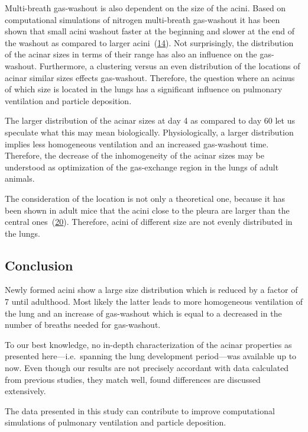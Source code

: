 \documentclass[
  american,
]{article}
\begin{document}
Multi-breath gas-washout is also dependent on the size of the acini.
Based on computational simulations of nitrogen multi-breath gas-washout it has been shown that small acini washout faster at the beginning and slower at the end of the washout as compared to larger acini~(\protect\hyperlink{ref-eb0gk6VO}{14}).
Not surprisingly, the distribution of the acinar sizes in terms of their range has also an influence on the gas-washout.
Furthermore, a clustering versus an even distribution of the locations of acinar similar sizes effects gas-washout.
Therefore, the question where an acinus of which size is located in the lungs has a significant influence on pulmonary ventilation and particle deposition.

The larger distribution of the acinar sizes at day 4 as compared to day 60 let us speculate what this may mean biologically.
Physiologically, a larger distribution implies less homogeneous ventilation and an increased gas-washout time.
Therefore, the decrease of the inhomogeneity of the acinar sizes may be understood as optimization of the gas-exchange region in the lungs of adult animals.

The consideration of the location is not only a theoretical one, because it has been shown in adult mice that the acini close to the pleura are larger than the central ones~(\protect\hyperlink{ref-RGBeCf8v}{20}).
Therefore, acini of different size are not evenly distributed in the lungs.

\hypertarget{conclusion}{%
\subsection{Conclusion}\label{conclusion}}

Newly formed acini show a large size distribution which is reduced by a factor of 7 until adulthood.
Most likely the latter leads to more homogeneous ventilation of the lung and an increase of gas-washout which is equal to a decreased in the number of breaths needed for gas-washout.

To our best knowledge, no in-depth characterization of the acinar properties as presented here---i.e.~spanning the lung development period---was available up to now.
Even though our results are not precisely accordant with data calculated from previous studies, they match well, found differences are discussed extensively.

The data presented in this study can contribute to improve computational simulations of pulmonary ventilation and particle deposition.
\end{document}
